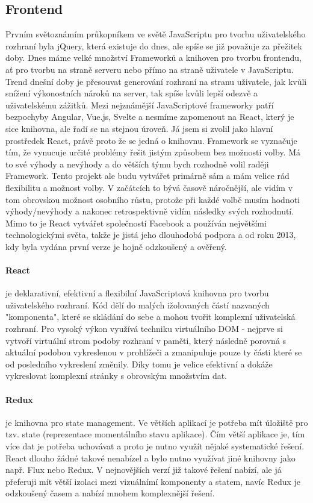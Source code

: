 \documentclass[thesis=B,czech]{FITthesis}[2019/12/23]
\begin{document}
\subsection{Frontend}
Prvním světoznámím průkopníkem ve světě JavaScriptu pro tvorbu uživatelského rozhraní byla jQuery, která existuje do dnes, ale spíše se již považuje za přežitek doby. Dnes máme velké množství Frameworků a knihoven pro tvorbu frontendu, ať pro tvorbu na straně serveru nebo přímo na straně uživatele v JavaScriptu. Trend dnešní doby je přesouvat generování rozhraní na stranu uživatele, jak kvůli snížení výkonostních nároků na server, tak spíše kvůli lepší odezvě a uživatelskému zážitků. Mezi nejznámější JavaScriptové frameworky patří bezpochyby Angular, Vue.js, Svelte a nesmíme zapomenout na React, který je sice knihovna, ale řadí se na stejnou úroveň. Já jsem si zvolil jako hlavní prostředek React, právě proto že se jedná o knihovnu. Framework se vyznačuje tím, že vynucuje určité problémy řešit jistým způsobem bez možnosti volby. Má to své výhody a nevýhody a do větších týmu bych rozhodně volil raději Framework. Tento projekt ale budu vytvářet primárně sám a mám velice rád flexibilitu a možnost volby. V začátcích to bývá časově náročnější, ale vidím v tom obrovskou možnost osobního růstu, protože při každé volbě musím hodnoti výhody/nevýhody a nakonec retrospektivně vidím následky svých rozhodnutí. Mimo to je React vytvářet společností Facebook a používán největšími technologickými světa, takže je jistá jeho dlouhodobá podpora a od roku 2013, kdy byla vydána první verze je hojně odzkoušený a ověřený.

\paragraph{React} je deklarativní, efektivní a flexibilní JavaScriptová knihovna pro tvorbu uživatelského rozhraní. Kód dělí do malých ižolovaných částí nazvaných "komponenta", které se skládání do sebe a mohou tvořit komplexní uživatelská rozhraní. Pro vysoký výkon využívá techniku virtuálního DOM - nejprve si vytvoří virtuální strom podoby rozhraní v paměti, který následně porovná s aktuální podobou vykreslenou v prohlížeči a zmanipuluje pouze ty části které se od posledního vykreslení změnily. Díky tomu je velice efektivní a dokáže vykreslovat komplexní stránky s obrovským množstvím dat.

\paragraph{Redux} je knihovna pro state management. Ve větších aplikací je potřeba mít úložiště pro tzv. state (reprezentace momentálního stavu aplikace). Čím větší aplikace je, tím více dat je potřeba uchovávat a proto je nutno využít nějaké systematické řešení. React dlouho žádné takové nenabízel a bylo nutno využívat jiné knihovny jako např. Flux nebo Redux. V nejnovějších verzí již takové řešení nabízí, ale já přeferuji mít větší izolaci mezi vizuálnímí komponenty a statem, navíc Redux je odzkoušený časem a nabízí mnohem komplexnější řešení. 
\end{document}
